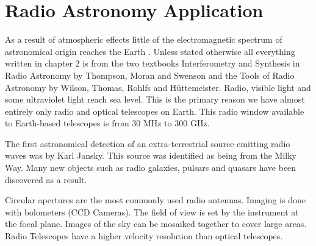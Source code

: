 
\chapter{Radio Astronomy Application} %

\label{Chapter6} %



As a result of atmospheric effects little of the electromagnetic spectrum of astronomical origin reaches the Earth \citep{wilson2009tools}\citep{thompson1994interferometry}.
Unless stated otherwise all everything written in chapter 2 is from the two textbooks Interferometry and Synthesis in Radio Astronomy by Thompson, Moran and Swenson and the Tools of Radio Astronomy by Wilson, Thomas, Rohlfs and H{\"u}ttemeister.
Radio, visible light and some ultraviolet light reach sea level.
This is the primary reason we have almost entirely only radio and optical telescopes on Earth.
This radio window available to Earth-based telescopes is from $30$ MHz to $300$ GHz\citep{van2009radio}.

The first astronomical detection of an extra-terrestrial source emitting radio waves was by Karl Jansky\citep{thompson1994interferometry}.
This source was identified as being from the Milky Way.
Many new objects such as radio galaxies, pulsars and quasars have been discovered as a result\citep{thompson1994interferometry}.


Circular apertures are the most commonly used radio antennas.
Imaging is done with bolometers (CCD Cameras).
The field of view is set by the instrument at the focal plane.
Images of the sky can be mosaiked together to cover large areas.
Radio Telescopes have a higher velocity resolution than optical telescopes.


